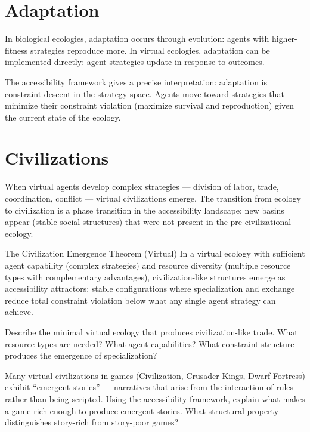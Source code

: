 \section{Adaptation}

In biological ecologies, adaptation occurs through evolution: agents
with higher-fitness strategies reproduce more. In virtual ecologies,
adaptation can be implemented directly: agent strategies update in
response to outcomes.

The accessibility framework gives a precise interpretation: adaptation
is constraint descent in the strategy space. Agents move toward
strategies that minimize their constraint violation (maximize survival
and reproduction) given the current state of the ecology.

\section{Civilizations}

When virtual agents develop complex strategies — division of labor,
trade, coordination, conflict — virtual civilizations emerge. The
transition from ecology to civilization is a phase transition in the
accessibility landscape: new basins appear (stable social structures)
that were not present in the pre-civilizational ecology.

\begin{namedthm}{The Civilization Emergence Theorem (Virtual)}
  In a virtual ecology with sufficient agent capability (complex
  strategies) and resource diversity (multiple resource types with
  complementary advantages), civilization-like structures emerge
  as accessibility attractors: stable configurations where specialization
  and exchange reduce total constraint violation below what any single
  agent strategy can achieve.
\end{namedthm}

\begin{exercise}
  Describe the minimal virtual ecology that produces civilization-like
  trade. What resource types are needed? What agent capabilities?
  What constraint structure produces the emergence of specialization?
\end{exercise}

\begin{exercise}
  Many virtual civilizations in games (Civilization, Crusader Kings,
  Dwarf Fortress) exhibit ``emergent stories'' — narratives that arise
  from the interaction of rules rather than being scripted. Using
  the accessibility framework, explain what makes a game rich enough
  to produce emergent stories. What structural property distinguishes
  story-rich from story-poor games?
\end{exercise}
